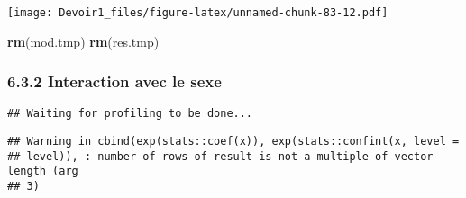 \documentclass[]{article}
\newenvironment{Shaded}{\begin{snugshade}}{\end{snugshade}}
\newcommand{\KeywordTok}[1]{\textcolor[rgb]{0.13,0.29,0.53}{\textbf{#1}}}
\newcommand{\DataTypeTok}[1]{\textcolor[rgb]{0.13,0.29,0.53}{#1}}
\newcommand{\DecValTok}[1]{\textcolor[rgb]{0.00,0.00,0.81}{#1}}
\newcommand{\StringTok}[1]{\textcolor[rgb]{0.31,0.60,0.02}{#1}}
\newcommand{\OperatorTok}[1]{\textcolor[rgb]{0.81,0.36,0.00}{\textbf{#1}}}
\newcommand{\NormalTok}[1]{#1}
\begin{document}
\texttt{[image: Devoir1\_files/figure-latex/unnamed-chunk-83-12.pdf]}

\begin{Shaded}
\begin{Highlighting}[]
\KeywordTok{rm}\NormalTok{(mod.tmp)}
\KeywordTok{rm}\NormalTok{(res.tmp)}
\end{Highlighting}
\end{Shaded}

\subsubsection{6.3.2 Interaction avec le
sexe}\label{interaction-avec-le-sexe}

\begin{Shaded}
\end{Shaded}

\begin{verbatim}
## Waiting for profiling to be done...
\end{verbatim}

\begin{verbatim}
## Warning in cbind(exp(stats::coef(x)), exp(stats::confint(x, level =
## level)), : number of rows of result is not a multiple of vector length (arg
## 3)
\end{verbatim}
\end{document}
